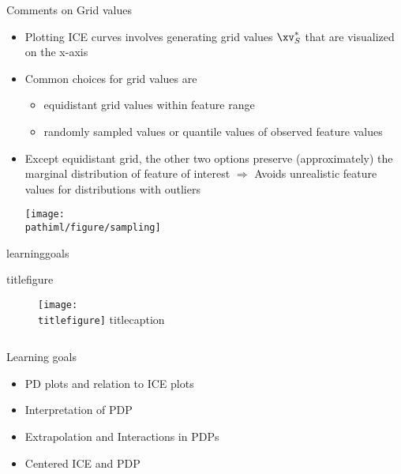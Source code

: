 \documentclass[11pt,compress,t,notes=noshow, aspectratio=169, xcolor=table]{beamer}
\makeatletter
\newcommand{\pathiml}{../../slides/03_feature-effects/}
\newcommand{\mysectionslide}{
\begin{frame}[plain]
    \vspace*{0.5 cm}
    \LARGE\bfseries\inserttitle
    \vspace*{0.5 cm}

    \ifx\lecturesection\@empty\relax\else%
    {\lecturesection}%
    \fi%

\ifcsname learninggoals\endcsname
  {\vspace*{0.5 cm}
  \begin{minipage}{0.4\textwidth}
  \ifcsname titlefigure\endcsname
    {\begin{center}
    \begin{figure}[!b]
    \texttt{[image: \\titlefigure]}
     \ifcsname titlecaption\endcsname
     \caption*{\titlecaption}
     \fi
    \end{figure}
    \end{center}}
  \else
    $\;$
  \fi
  \end{minipage}
  \begin{minipage}{0.55\textwidth}
  \normalsize
  Learning goals
   \normalfont
   \footnotesize
  \begin{itemize}
  \learninggoals
  \end{itemize}
  \end{minipage}}
\fi

  \end{frame}
}
\makeatother
\begin{document}
\begin{frame}{Comments on Grid values}
\begin{itemize}
\item Plotting ICE curves involves generating grid values $\xv_S^*$ that are visualized on the x-axis
\item Common choices for grid values are
\begin{itemize}
\item equidistant grid values within feature range
\item randomly sampled values or quantile values of observed feature values
\end{itemize}
\item Except equidistant grid, the other two options preserve (approximately) the marginal distribution of feature of interest
$\Rightarrow$ Avoids unrealistic feature values for distributions with outliers %

\vspace{3pt}
\centering
\texttt{[image: \\pathiml/figure/sampling]}

\end{itemize}
\end{frame}


\renewcommand{\titlefigure}{\pathiml/figure/pdp_bike}
\renewcommand{\learninggoals}{
\item PD plots and relation to ICE plots
\item Interpretation of PDP
\item Extrapolation and Interactions in PDPs
\item Centered ICE and PDP
}

\mysectionslide
\end{document}
